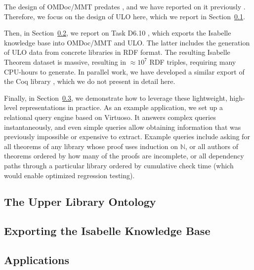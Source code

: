 The design of OMDoc/MMT predates \pn, and we have reported on it previously .
Therefore, we focus on the design of ULO here, which we report in Section~\ref{sec:ulo}.

Then, in Section~\ref{sec:isabelle}, we report on Task D6.10 , which exports the Isabelle knowledge base into OMDoc/MMT and ULO.
The latter includes the generation of ULO data from concrete libraries in RDF format.
The resulting Isabelle Theorem dataset is massive, resulting in  $\approx 10^7$ RDF triples, requiring many CPU-hours to generate.
In parallel work, we have developed a similar export of the Coq library , which we do not present in detail here.

Finally, in Section~\ref{sec:uloappl}, we demonstrate how to leverage these lightweight, high-level representations in practice.
As an example application, we set up a relational query engine based on Virtuoso.
It answers complex queries instantaneously, and even simple queries allow obtaining information that was previously impossible or expensive to extract.
Example queries include asking for all theorems of any library whose proof uses induction on $\mathbb{N}$,
or all authors of theorems ordered by how many of the proofs are incomplete,
or all dependency paths through a particular library ordered by cumulative check time (which would enable optimized regression testing).

\subsection{The Upper Library Ontology}\label{sec:ulo}


\subsection{Exporting the Isabelle Knowledge Base}\label{sec:isabelle}


\subsection{Applications}\label{sec:uloappl}



